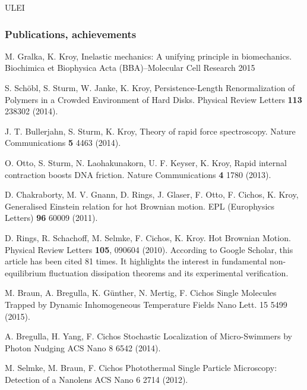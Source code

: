 \begin{sitedescription}{ULEI}
\subsubsection*{Publications, achievements}

\begin{compactenum}
\item M. Gralka, K. Kroy, Inelastic mechanics: A unifying principle in biomechanics. 
Biochimica et Biophysica Acta (BBA)--Molecular Cell Research 2015

\item S. Schöbl, S. Sturm, W. Janke, K. Kroy, Persistence-Length Renormalization of Polymers in a Crowded Environment of Hard Disks.
Physical Review Letters {\bf 113} 238302 (2014).

\item J. T. Bullerjahn, S. Sturm, K. Kroy, Theory of rapid force spectroscopy. Nature Communications {\bf 5} 4463 (2014).

\item O. Otto, S. Sturm, N. Laohakunakorn, U. F. Keyser, K. Kroy, Rapid internal contraction boosts DNA friction.
Nature Communications {\bf 4} 1780 (2013).

\item D. Chakraborty, M. V. Gnann, D. Rings, J. Glaser, F. Otto, F. Cichos, K. Kroy, 
Generalised Einstein relation for hot Brownian motion. EPL (Europhysics Letters) {\bf 96} 60009 (2011).

\item D. Rings, R. Schachoff, M. Selmke, F. Cichos, K. Kroy. 
Hot Brownian Motion.  Physical Review Letters {\bf 105},  090604 (2010). According to Google Scholar, this article has been cited 81 times. It highlights the interest in fundamental non-equilibrium fluctuation dissipation theorems and its experimental verification.

\item M. Braun, A. Bregulla, K. Günther, N. Mertig, F. Cichos Single Molecules Trapped by Dynamic Inhomogeneous Temperature Fields Nano Lett. 15 5499 (2015).

\item A. Bregulla, H. Yang, F. Cichos Stochastic Localization of Micro-Swimmers by Photon Nudging ACS Nano 8 6542 (2014).

\item M. Selmke, M. Braun, F. Cichos Photothermal Single Particle Microscopy: Detection of a Nanolens ACS Nano 6 2714 (2012).

\end{compactenum}


\end{sitedescription}
